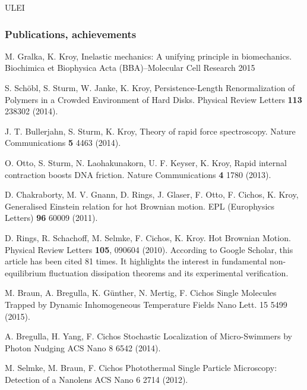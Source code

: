 \begin{sitedescription}{ULEI}
\subsubsection*{Publications, achievements}

\begin{compactenum}
\item M. Gralka, K. Kroy, Inelastic mechanics: A unifying principle in biomechanics. 
Biochimica et Biophysica Acta (BBA)--Molecular Cell Research 2015

\item S. Schöbl, S. Sturm, W. Janke, K. Kroy, Persistence-Length Renormalization of Polymers in a Crowded Environment of Hard Disks.
Physical Review Letters {\bf 113} 238302 (2014).

\item J. T. Bullerjahn, S. Sturm, K. Kroy, Theory of rapid force spectroscopy. Nature Communications {\bf 5} 4463 (2014).

\item O. Otto, S. Sturm, N. Laohakunakorn, U. F. Keyser, K. Kroy, Rapid internal contraction boosts DNA friction.
Nature Communications {\bf 4} 1780 (2013).

\item D. Chakraborty, M. V. Gnann, D. Rings, J. Glaser, F. Otto, F. Cichos, K. Kroy, 
Generalised Einstein relation for hot Brownian motion. EPL (Europhysics Letters) {\bf 96} 60009 (2011).

\item D. Rings, R. Schachoff, M. Selmke, F. Cichos, K. Kroy. 
Hot Brownian Motion.  Physical Review Letters {\bf 105},  090604 (2010). According to Google Scholar, this article has been cited 81 times. It highlights the interest in fundamental non-equilibrium fluctuation dissipation theorems and its experimental verification.

\item M. Braun, A. Bregulla, K. Günther, N. Mertig, F. Cichos Single Molecules Trapped by Dynamic Inhomogeneous Temperature Fields Nano Lett. 15 5499 (2015).

\item A. Bregulla, H. Yang, F. Cichos Stochastic Localization of Micro-Swimmers by Photon Nudging ACS Nano 8 6542 (2014).

\item M. Selmke, M. Braun, F. Cichos Photothermal Single Particle Microscopy: Detection of a Nanolens ACS Nano 6 2714 (2012).

\end{compactenum}


\end{sitedescription}
